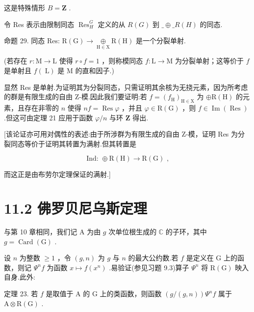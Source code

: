 \documentclass[10pt]{article}
\begin{document}
这是特殊情形 \(B = \mathbf{Z}\) .

令 Res 表示由限制同态 \({\operatorname{Res}}_{H}^{G}\) 定义的从 \(R\left( G\right)\) 到 \(\_  \oplus  \_ R\left( H\right)\) 的同态.

命题 29. 同态 Res: \(\mathrm{R}\left( \mathrm{G}\right)  \rightarrow  \underset{\mathrm{H} \in  \mathrm{X}}{ \oplus  }\mathrm{R}\left( \mathrm{H}\right)\) 是一个分裂单射.

(若存在 \(r : \mathrm{M} \rightarrow  \mathrm{L}\) 使得 \(r \circ  f = 1\) ，则称模同态 \(f : \mathrm{L} \rightarrow  \mathrm{M}\) 为分裂单射；这等价于 \(f\) 是单射且 \(f\left( \mathrm{\;L}\right)\) 是 \(\mathrm{M}\) 的直和因子.)

显然 Res 是单射.为证明其为分裂同态，只需证明其余核为无挠元素，因为所考虑的群是有限生成的自由 Z-模.因此我们要证明:若 \(f = {\left( {f}_{\mathrm{H}}\right) }_{\mathrm{H} \in  \mathrm{X}}\) 为 \(\oplus  \mathrm{R}\left( \mathrm{H}\right)\) 的元素，且存在非零的 \(n\) 使得 \({nf} = \operatorname{Res}\varphi\) ，并且 \(\varphi  \in  \mathrm{R}\left( \mathrm{G}\right)\) ，则 \(f \in  \operatorname{Im}\left( \operatorname{Res}\right)\) .但这可由定理 21 应用于函数 \(\varphi /n\) 与环 \(\mathbf{Z}\) 得出.

[该论证亦可用对偶性的表述:由于所涉群为有限生成的自由 Z-模，证明 Res 为分裂同态等价于证明其转置为满射.但其转置是

\[
\text{ Ind: } \oplus  \mathrm{R}\left( \mathrm{H}\right)  \rightarrow  \mathrm{R}\left( \mathrm{G}\right) \text{ , }
\]

而这正是由布劳尔定理保证的满射.]

\section*{11.2 佛罗贝尼乌斯定理}

与第 10 章相同，我们记 A 为由 \(g\) 次单位根生成的 \(\mathbb{C}\) 的子环，其中 \(g = \operatorname{Card}\left( \mathrm{G}\right)\) .

设 \(n\) 为整数 \(\geq  1\) ，令 \(\left( {g,n}\right)\) 为 \(g\) 与 \(n\) 的最大公约数.若 \(f\) 是定义在 \(\mathrm{G}\) 上的函数，则记 \({\Psi }^{n}f\) 为函数 \(x \mapsto  f\left( {x}^{n}\right)\) .易验证(参见习题 9.3)算子 \({\Psi }^{n}\) 将 \(\mathrm{R}\left( \mathrm{G}\right)\) 映入自身.此外:

定理 23. 若 \(f\) 是取值于 \(\mathrm{A}\) 的 \(\mathrm{G}\) 上的类函数，则函数 \(\left( {g/\left( {g,n}\right) }\right) {\Psi }^{n}f\) 属于 \(\mathrm{A} \otimes  \mathrm{R}\left( \mathrm{G}\right)\) .
\end{document}
